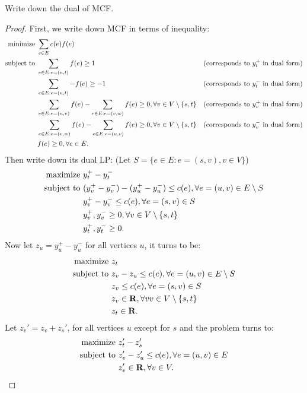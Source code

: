 

    \begin{thm}{}{}
        Write down the dual of MCF. 
    \end{thm}

    \begin{proof}
        First, we write down MCF in terms of inequality: 
        \begin{align*}
            {\rm minimize}\ &\sum_{e\in E}c(e)f(e)\\
            {\rm subject\ to}\ &\sum_{e\in E:e=(u,t)}f(e)\geq 1 & \text{(corresponds to $y_t^+$ in dual form)}\\
                &\sum_{e\in E:e=(u,t)}-f(e)\geq -1 & \text{(corresponds to $y_t^-$ in dual form)}\\
                &\sum_{e\in E:e=(u,v)}f(e)-\sum_{e\in E:e=(v,w)}f(e)\geq 0,\forall v\in V\setminus\{s,t\} & \text{(corresponds to $y_v^+$ in dual form)}\\
                &\sum_{e\in E:e=(v,w)}f(e)-\sum_{e\in E:e=(u,v)}f(e)\geq 0,\forall v\in V\setminus\{s,t\} & \text{(corresponds to $y_v^-$ in dual form)}\\
                &f(e) \geq 0, \forall e \in E.
        \end{align*}
        Then write down its dual LP: (Let $S=\{e\in E:e=(s,v),v\in V\}$)
        \begin{align*}
            {\rm maximize}\ &y_t^+-y_t^-\\
            {\rm subject\ to}\ &(y_v^+-y_v^-)-(y_u^+-y_u^-)\leq c(e),\forall e=(u,v)\in E\setminus S\\
                        &y_v^+-y_v^-\leq c(e),\forall e=(s,v)\in S \\
                        & y_v^+, y_v^- \geq 0, \forall v\in V\setminus\{s,t\} \\
                        & y_t^+, y_t^- \geq 0.
        \end{align*}
        Now let $z_u=y_u^+-y_u^-$ for all vertices $u$, it turns to be: 
        \begin{align*}
            {\rm maximize}\ &z_t\\
            {\rm subject\ to}\ &z_v-z_u\leq c(e),\forall e=(u,v)\in E\setminus S\\
                        &z_v\leq c(e),\forall e=(s,v)\in S \\
                        & z_v \in \mathbf{R}, \forall v v\in V\setminus\{s,t\} \\
                        & z_t \in \mathbf{R}.
        \end{align*}
        Let $z_v'=z_v+z_s'$, for all vertices $u$ except for $s$ and the problem turns to: 
        \begin{align*}
            {\rm maximize}\ &z_t'-z_s'\\
            {\rm subject\ to}\ &z_v'-z_u'\leq c(e),\forall e=(u,v)\in E \\
            & z_v' \in \mathbf{R}, \forall v \in V.
        \end{align*}
    \end{proof}


